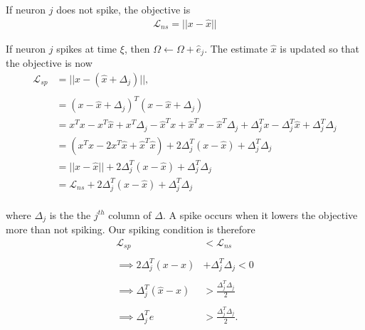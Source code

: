 \begin{enumerate}
If neuron $j$ does not spike, the objective is
\begin{align*}
    \mathcal{L}_{ns} = ||x - \hat{x}||
\end{align*}
 
If neuron $j$ spikes at time $\xi$, then $\Omega \leftarrow \Omega + \hat{e}_j$. The estimate $\hat{x}$ is updated so that the objective is now
\begin{align*}
    \mathcal{L}_{sp} &= || x - (\hat{x} + \Delta_j) ||,\\
    \\
    &= 
    (x-\hat{x}+\Delta_j)^T (x-\hat{x}+\Delta_j)\\
    &= 
    x^T x - x^T \hat{x} + x^T \Delta_j
    - \hat{x}^T x +\hat{x}^T\hat{x} -\hat{x}^T \Delta_j
    +
    \Delta_j^T x - \Delta_j^T \hat{x} + \Delta_j^T \Delta_j
    \\
    &=
    \left(x^T x -2 x^T \hat{x} +\hat{x}^T\hat{x}  \right) + 
    2 \Delta_j^T \left( x - \hat{x}
    \right) + \Delta_j^T \Delta_j\\
    &= 
    ||x -\hat{x}|| +  2 \Delta_j^T \left( x - \hat{x}
    \right) + \Delta_j^T \Delta_j\\
    &= 
    \mathcal{L}_{ns} + 2 \Delta_j^T \left( x - \hat{x}
    \right) + \Delta_j^T \Delta_j\\
\end{align*}

where $\Delta_j$ is the the $j^{th}$ column of $\Delta$. A spike occurs when it lowers the objective more than not spiking. Our spiking condition is therefore
\begin{align*}
    \mathcal{L}_{sp} &< \mathcal{L}_{ns}\\
    \\
    \implies
     2 \Delta_j^T \left( x - \hat{x}
    \right) &+ \Delta_j^T \Delta_j < 0\\
    \\
    \implies 
    \Delta_j^T \left(\hat{x} -x \right) &> \frac{\Delta_j ^T \Delta_j}{2}\\
    \\
    \implies
    \Delta_j^T e &> \frac{\Delta_j^T \Delta_j}{2}.
\end{align*}


\end{enumerate}
